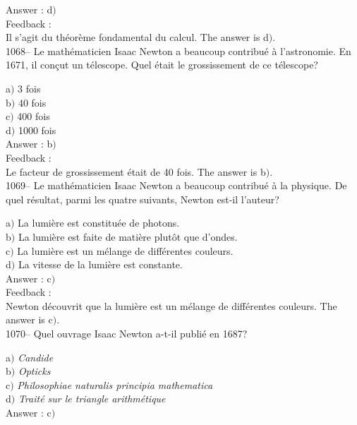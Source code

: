 ﻿\documentclass[letterpaper, 12pt]{article}
\begin{document}
Answer : d$)$ \\

Feedback : \\
Il s'agit du th\'eor\`eme fondamental du calcul.
The answer is d$)$.\\

1068-- Le math\'ematicien Isaac Newton a beaucoup contribu\'e \`a
l'astronomie. En 1671, il con\c cut un t\'elescope. Quel \'etait le
grossissement de ce t\'elescope?

a$)$ 3 fois \\
b$)$ 40 fois  \\
c$)$ 400 fois  \\
d$)$ 1000 fois \\

Answer : b$)$ \\

Feedback : \\
Le facteur de grossissement \'etait de 40 fois.
The answer is b$)$.\\

1069-- Le math\'ematicien Isaac Newton a beaucoup contribu\'e \`a la
physique. De quel r\'esultat, parmi les quatre suivants, Newton
est-il l'auteur?

a$)$ La lumi\`ere est constitu\'ee de photons. \\
b$)$ La lumi\`ere est faite de mati\`ere plut\^ot que d'ondes.  \\
c$)$ La lumi\`ere est un \og m\'elange de diff\'erentes couleurs\fg .  \\
d$)$ La vitesse de la lumi\`ere est constante.\\

Answer : c$)$ \\

Feedback : \\
Newton d\'ecouvrit que la lumi\`ere est un \og m\'elange de
diff\'erentes couleurs\fg .
The answer is c$)$.\\

1070-- Quel ouvrage Isaac Newton a-t-il publi\'e en 1687?

a$)$ {\sl Candide} \\
b$)$ {\sl Opticks}  \\
c$)$ {\sl Philosophiae naturalis principia mathematica}  \\
d$)$ {\sl Trait\'e sur le triangle arithm\'etique}\\

Answer : c$)$\\
\end{document}

